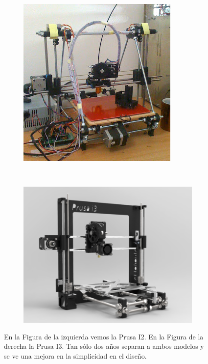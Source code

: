 \begin{figure}[H]
	\centering
	\begin{subfigure}[b]{0.45\textwidth}
	    \centering
	     \includegraphics[width=\textwidth]{images/prusa_i2.jpg}
	    \label{fig:prusa2}
	\end{subfigure}
	~
	\begin{subfigure}[b]{0.45\textwidth}
	     \centering
	     \includegraphics[width=\textwidth]{images/prusa_i3.png}
	    \label{fig:prusa3}
	\end{subfigure}
	\caption[Evolución de las impresoras diseñadas por Josef Prusa.]{En la Figura de la izquierda vemos la Prusa I2. En la Figura de la derecha la Prusa I3. Tan sólo dos años separan a ambos modelos y se ve una mejora en la simplicidad en el diseño.}
	\label{fig:evol_prusa}
\end{figure}

